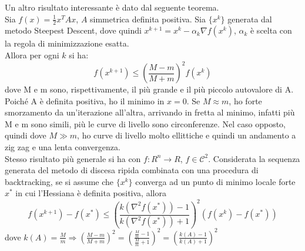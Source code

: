 \documentclass{report}
\begin{document}
Un altro risultato interessante è dato dal seguente teorema.\\
Sia $f(x) = \frac{1}{2} x^T A x$, $A$ simmetrica definita positiva. Sia $\{x^k\}$ generata dal metodo Steepest Descent, dove quindi $x^{k+1} = x^k - \alpha_k \nabla f(x^k)$, $\alpha_k$ è scelta con la regola di minimizzazione esatta.\\
Allora per ogni $k$ si ha:
\begin{equation}
	f(x^{k+1}) \leqslant \left(\frac{M - m}{M + m}\right)^2 f (x^k)
\end{equation}
dove M e m sono, rispettivamente, il più grande e il più piccolo autovalore di A.\\
Poiché A è definita positiva, ho il minimo in $x = 0$. Se $M \approx m$, ho forte smorzamento da un'iterazione all'altra, arrivando in fretta al minimo, infatti più M e m sono simili, più le curve di livello sono circonferenze. Nel caso opposto, quindi dove $M \gg m$, ho curve di livello molto ellittiche e quindi un andamento a zig zag e una lenta convergenza.\\
Stesso risultato più generale si ha con $f : R^n \rightarrow R$, $f \in \mathcal{C}^2$. Considerata la sequenza generata del metodo di discesa ripida combinata con una procedura di backtracking, se si assume che $\{ x^k\}$ converga ad un punto di minimo locale forte $x^*$ in cui l'Hessiana è definita positiva, allora
\begin{equation}
	f(x^{k+1}) - f(x^*) \leqslant \left(\frac{k\left(\nabla^2  f(x^*)\right) - 1}{k\left(\nabla^2  f(x^*)\right) + 1}\right)^2 \left(f(x^k) - f(x^*)\right)
\end{equation}
dove $k(A) = \frac{M}{m} \Rightarrow \left(\frac{M- m}{M+m}\right)^2 = \left(\frac{\frac{M}{m}- 1 }{\frac{M}{m} + 1 }\right)^2 = \left(\frac{k(A)- 1}{k(A)+1}\right)^2 $
\end{document}
